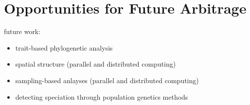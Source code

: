\section{Opportunities for Future Arbitrage} \label{sec:opportunities}

future work:
\begin{itemize}
  \item trait-based phylogenetic analysis
  \item spatial structure (parallel and distributed computing)
  \item sampling-based anlayses (parallel and distributed computing)
  \item detecting speciation through population genetics methods \citep{sukumaran2021incorporating}
\end{itemize}
